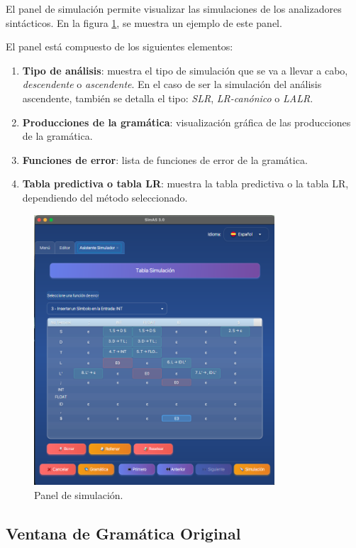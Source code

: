 El panel de simulación permite visualizar las simulaciones de los analizadores sintácticos. En la figura \ref{fig:d6}, se muestra un ejemplo de este panel.

El panel está compuesto de los siguientes elementos:
\begin{enumerate}
 \item \textbf{Tipo de análisis}: muestra el tipo de simulación que se va a llevar a cabo, \textit{descendente} o \textit{ascendente}. En el caso de ser la simulación del análisis ascendente, también se detalla el tipo: \textit{SLR}, \textit{LR-canónico} o \textit{LALR}.
 \item \textbf{Producciones de la gramática}: visualización gráfica de las producciones de la gramática.
 \item \textbf{Funciones de error}: lista de funciones de error de la gramática.
 \item \textbf{Tabla predictiva o tabla LR}: muestra la tabla predictiva o la tabla LR, dependiendo del método seleccionado.
\end{enumerate}

\begin{figure}[htp]
\centering
	\includegraphics[width=0.8\textwidth]{figuras2/simulador/paso5_tablaPredictivaCompleta.png}
	\caption{Panel de simulación.}
	\label{fig:d6}
\end{figure}

\subsection{Ventana de Gramática Original}

